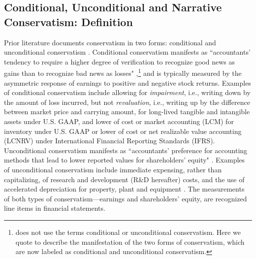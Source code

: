 \documentclass[a4paper]{article}
\begin{document}
\begin{spacing}{2}
\subsection{Conditional, Unconditional and Narrative Conservatism: Definition}
Prior literature documents conservatism in two forms: conditional and unconditional conservatism \cite{beaverConditionalUnconditionalConservatism2005}. Conditional conservatism manifests as ``accountants' tendency to require a higher degree of verification to recognize good news as gains than to recognize bad news as losses" ,\footnote{ does not use the terms conditional or unconditional conservatism. Here we quote  to describe the manifestation of the two forms of conservatism, which are now labeled as conditional and unconditional conservatism.} and is typically measured by the asymmetric response of earnings to positive and negative stock returns. Examples of conditional conservatism include allowing for \textit{impairment}, i.e., writing down by the amount of loss incurred, but not \textit{revaluation}, i.e., writing up by the difference between market price and carrying amount, for long-lived tangible and intangible assets under U.S. GAAP, and lower of cost or market accounting (LCM) for inventory under U.S. GAAP or lower of cost or net realizable value accounting (LCNRV) under International Financial Reporting Standards (IFRS). Unconditional conservatism manifests as ``accountants' preference for accounting methods that lead to lower reported values for shareholders' equity" . Examples of unconditional conservatism include immediate expensing, rather than capitalizing, of research and development (R\&D hereafter) costs, and the use of accelerated depreciation for property, plant and equipment . The measurements of both types of conservatism---earnings and shareholders' equity, are recognized line items in financial statements. %


\end{spacing}
\end{document}

